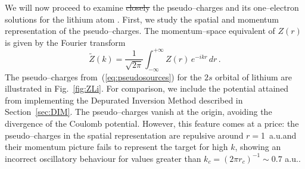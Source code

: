 \documentclass[10pt]{article}
\providecommand{\DIFaddtex}[1]{{\protect\color{blue}\uwave{#1}}} %
\providecommand{\DIFdeltex}[1]{{\protect\color{red}\sout{#1}}}                      %
\providecommand{\DIFaddbegin}{} %
\providecommand{\DIFaddend}{} %
\providecommand{\DIFdelbegin}{} %
\providecommand{\DIFdelend}{} %
\providecommand{\DIFadd}[1]{\texorpdfstring{\DIFaddtex{#1}}{#1}} %
\providecommand{\DIFdel}[1]{\texorpdfstring{\DIFdeltex{#1}}{}} %
\begin{document}
We will now proceed to examine \DIFdelbegin \DIFdel{closely }\DIFdelend the pseudo--charges and its 
one--electron solutions for the lithium atom \DIFaddbegin \DIFadd{closely}\DIFaddend . 
First, we study the spatial and momentum representation of the 
pseudo--charges. The momentum--space equivalent of $Z(r)$ is given 
by the Fourier transform
\begin{equation}
 \widetilde{Z}(k) = \frac{1}{\sqrt{2\pi}} \int_{-\infty}^{+\infty} 
 Z(r)\,e^{-ikr}\,dr\,.
\end{equation}
The pseudo--charges from~(\ref{eq:pseudosources}) for the $2s$ 
orbital of lithium are illustrated in Fig.~\ref{fig:ZLi}. 
For comparison, we include the potential attained from implementing 
the Depurated Inversion Method described in Section~\ref{sec:DIM}.
The pseudo--charges vanish at the origin, avoiding the divergence 
of the Coulomb potential. However, this feature comes at a price: 
the pseudo--charges in the spatial representation are repulsive 
around \mbox{$r= $1 a.u.}\DIFaddbegin \DIFadd{, }\DIFaddend and their momentum picture fails to represent the 
target for high $k$, showing an incorrect oscillatory behaviour for 
values greater than $k_c=(2\pi r_c)^{-1}\sim0.7$ a.u..
\end{document}
